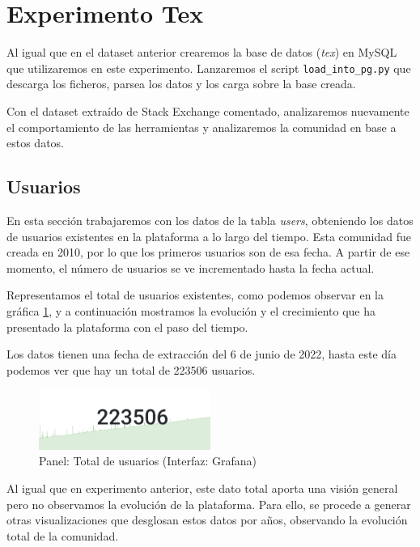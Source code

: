 \documentclass[a4paper, 12pt]{book}
\begin{document}
\clearpage

\section{Experimento Tex}
\label{chap:exper_stack}

Al igual que en el dataset anterior crearemos la base de datos (\emph{tex}) en MySQL que utilizaremos en este experimento. Lanzaremos el script \texttt{load\_into\_pg.py} que descarga los ficheros, parsea los datos y los carga sobre la base creada.

Con el dataset extraído de Stack Exchange comentado, analizaremos nuevamente el comportamiento de las herramientas y analizaremos la comunidad en base a estos datos. 


\subsection{Usuarios}
En esta sección trabajaremos con los datos de la tabla \emph{users}, obteniendo los datos de usuarios existentes en la plataforma a lo largo del tiempo. Esta comunidad fue creada en 2010, por lo que los primeros usuarios son de esa fecha. A partir de ese momento, el número de usuarios se ve incrementado hasta la fecha actual. 

Representamos el total de usuarios existentes, como podemos observar en la gráfica \ref{figura:total_users_tex}, y a continuación mostramos la evolución y el crecimiento que ha presentado la plataforma con el paso del tiempo. 

Los datos tienen una fecha de extracción del 6 de junio de 2022, hasta este día podemos ver que hay un total de 223506 usuarios. 

\begin{figure}[ht]
    \centering
    \includegraphics[width=0.5\textwidth]{img/tex/Total_usuarios_tex.png}
    \caption{Panel: Total de usuarios (Interfaz: Grafana)}
    \label{figura:total_users_tex}
\end{figure}


Al igual que en experimento anterior, este dato total aporta una visión general pero no observamos la evolución de la plataforma. Para ello, se procede a generar otras visualizaciones que desglosan estos datos por años, observando la evolución total de la comunidad.
\end{document}
